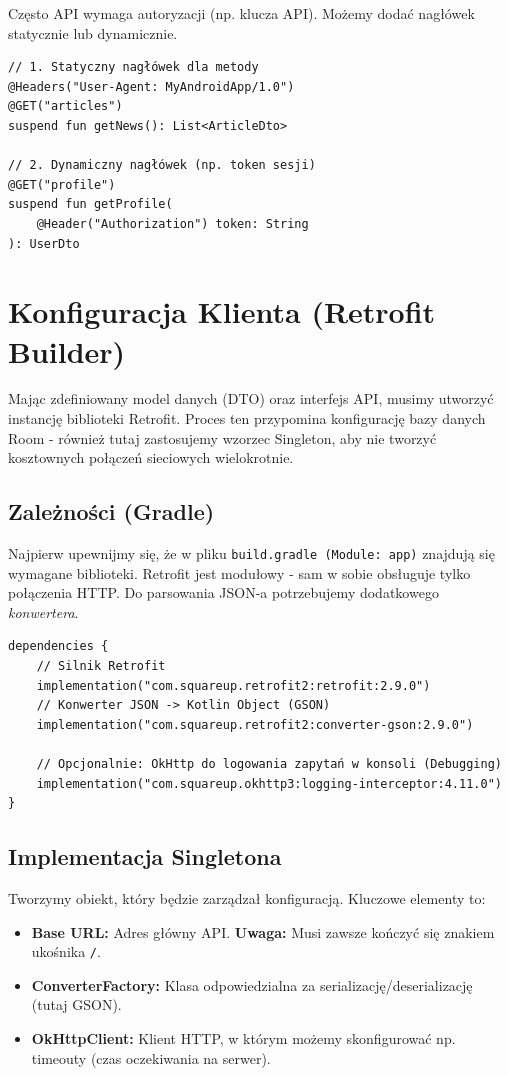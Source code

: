 Często API wymaga autoryzacji (np. klucza API). Możemy dodać nagłówek statycznie lub dynamicznie.

\begin{verbatim}
// 1. Statyczny nagłówek dla metody
@Headers("User-Agent: MyAndroidApp/1.0")
@GET("articles")
suspend fun getNews(): List<ArticleDto>

// 2. Dynamiczny nagłówek (np. token sesji)
@GET("profile")
suspend fun getProfile(
    @Header("Authorization") token: String
): UserDto
\end{verbatim}

\section{Konfiguracja Klienta (Retrofit Builder)}

Mając zdefiniowany model danych (DTO) oraz interfejs API, musimy utworzyć instancję biblioteki Retrofit. Proces ten przypomina konfigurację bazy danych Room - również tutaj zastosujemy wzorzec Singleton, aby nie tworzyć kosztownych połączeń sieciowych wielokrotnie.

\subsection{Zależności (Gradle)}

Najpierw upewnijmy się, że w pliku \texttt{build.gradle (Module: app)} znajdują się wymagane biblioteki. Retrofit jest modułowy - sam w sobie obsługuje tylko połączenia HTTP. Do parsowania JSON-a potrzebujemy dodatkowego \textit{konwertera}.

\begin{verbatim}
dependencies {
    // Silnik Retrofit
    implementation("com.squareup.retrofit2:retrofit:2.9.0")
    // Konwerter JSON -> Kotlin Object (GSON)
    implementation("com.squareup.retrofit2:converter-gson:2.9.0")
    
    // Opcjonalnie: OkHttp do logowania zapytań w konsoli (Debugging)
    implementation("com.squareup.okhttp3:logging-interceptor:4.11.0")
}
\end{verbatim}

\subsection{Implementacja Singletona}

Tworzymy obiekt, który będzie zarządzał konfiguracją. Kluczowe elementy to:
\begin{itemize}
    \item \textbf{Base URL:} Adres główny API. \textbf{Uwaga:} Musi zawsze kończyć się znakiem ukośnika \texttt{/}.
    \item \textbf{ConverterFactory:} Klasa odpowiedzialna za serializację/deserializację (tutaj GSON).
    \item \textbf{OkHttpClient:} Klient HTTP, w którym możemy skonfigurować np. timeouty (czas oczekiwania na serwer).
\end{itemize}

